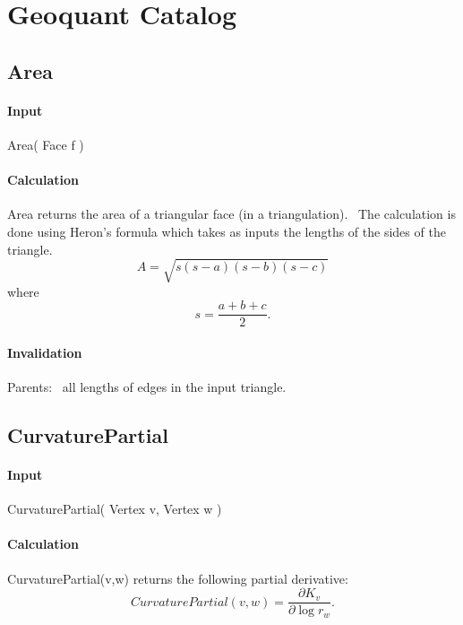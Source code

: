 \section{Geoquant Catalog}

\subsection{Area}

\paragraph{Input}

Area( Face f )

\paragraph{Calculation}

Area returns the area of a triangular face (in a triangulation). \ The
calculation is done using Heron's formula which takes as inputs the lengths
of the sides of the triangle.%
\begin{equation*}
A=\sqrt{s\left( s-a\right) \left( s-b\right) \left( s-c\right) }
\end{equation*}%
where%
\begin{equation*}
s=\frac{a+b+c}{2}.
\end{equation*}

\paragraph{Invalidation}

Parents: \ all lengths of edges in the input triangle.

\subsection{CurvaturePartial}

\paragraph{Input}

CurvaturePartial( Vertex v, Vertex w )

\paragraph{Calculation}

CurvaturePartial(v,w) returns the following partial derivative:%
\begin{equation*}
CurvaturePartial(v,w)=\frac{\partial K_{v}}{\partial \log r_{w}}.
\end{equation*}

